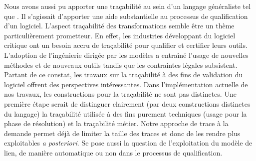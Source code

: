 Nous avons aussi pu apporter une traçabilité au sein d'un langage généraliste
tel que {\java}. Il s'agissait d'apporter une aide substantielle au processus
de qualification d'un logiciel. L'aspect traçabilité des transformations semble
être un thème particulièrement prometteur. En effet, les industries développant
du logiciel critique ont un besoin accru de traçabilité pour qualifier et
certifier leurs outils. L'adoption de l'ingénierie dirigée par les modèles a
entraîné l'usage de nouvelles méthodes et de nouveaux outils tandis que les
contraintes légales subsistent. Partant de ce constat, les travaux sur la
traçabilité à des fins de validation du logiciel offrent des perspectives
intéressantes. Dans l'implémentation actuelle de nos travaux, les constructions
pour la traçabilité ne sont pas distinctes. Une première étape serait de
distinguer clairement (par deux constructions distinctes du langage) la
traçabilité utilisée à des fins purement techniques (usage pour la phase de
résolution) et la traçabilité métier. Notre approche de trace à la demande
permet déjà de limiter la taille des traces et donc de les rendre plus
exploitables \emph{a posteriori}. Se pose aussi la question de l'exploitation
du modèle de lien, de manière automatique ou non dans le processus de
qualification.




